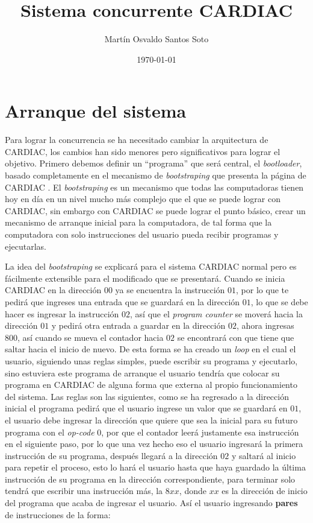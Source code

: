 \documentclass[12pt]{article}
\title{Sistema concurrente CARDIAC}
\author{Martín Osvaldo Santos Soto}
\date{\today}
\begin{document}
	\maketitle
	
	\section{ Arranque del sistema}
 	 
 	 Para lograr la concurrencia se ha necesitado cambiar la arquitectura de CARDIAC, los cambios han sido menores pero significativos
	 para lograr el objetivo. Primero debemos definir un ``programa'' que será central, el \textit{bootloader}, basado
	 completamente en el mecanismo de \textit{bootstraping} que presenta la página de CARDIAC \cite{noauthor_cardiac_nodate}. El \textit{bootstraping} es un 
	 mecanismo que todas las computadoras tienen hoy en día en un nivel mucho más complejo que el que se puede lograr con CARDIAC, sin
	 embargo con CARDIAC se puede lograr el punto básico, crear un mecanismo de arranque inicial para la computadora, de tal forma
	 que la computadora con solo instrucciones del usuario pueda recibir programas y ejecutarlas. 
	 
	 La idea del \textit{bootstraping} se explicará para el sistema CARDIAC normal pero es fácilmente extensible para el modificado
	 que se presentará. Cuando se inicia CARDIAC en la dirección $00$ ya se encuentra la instrucción $01$, por lo que te pedirá
	 que ingreses una entrada que se guardará en la dirección $01$, lo que se debe hacer es ingresar la instrucción $02$, así
	 que el \textit{program counter} se moverá hacia la dirección $01$ y pedirá otra entrada a guardar en la dirección $02$, ahora
	 ingresas $800$, así cuando se mueva el contador hacia $02$ se encontrará con que tiene que saltar hacia el inicio de nuevo. De
	 esta forma se ha creado un \textit{loop} en el cual el usuario, siguiendo unas reglas simples, puede escribir su programa
	 y ejecutarlo, sino estuviera este programa de arranque el usuario tendría que colocar su programa en CARDIAC de alguna forma
	 que externa al propio funcionamiento del sistema. Las reglas son las siguientes, como se ha regresado a la dirección
	 inicial el programa pedirá que el usuario ingrese un valor que se guardará en $01$, el usuario debe ingresar la dirección que
	 quiere que sea la inicial para su futuro programa con el \textit{op-code} $0$, por que el contador leerá justamente esa instrucción
	 en el siguiente paso, por lo que una vez hecho eso el usuario ingresará la primera instrucción de su programa, después llegará a la
	 dirección $02$ y saltará al inicio para repetir el proceso, esto lo hará el usuario hasta que haya guardado la última instrucción
	 de su programa en la dirección correspondiente, para terminar solo tendrá que escribir una instrucción más, la $8xx$, donde
	 $xx$ es la dirección de inicio del programa que acaba de ingresar el usuario. Así el usuario ingresando \textbf{pares} de 
	 instrucciones de la forma:
	
\end{document}
